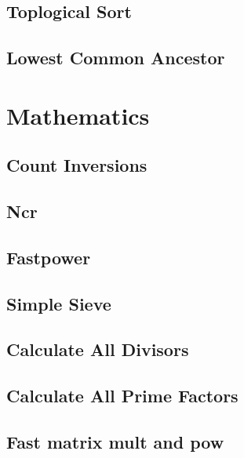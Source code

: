 \subsection{Toplogical Sort}
\raggedbottom
\hrulefill
\subsection{Lowest Common Ancestor}
\raggedbottom
\hrulefill

\section{Mathematics}
\subsection{Count Inversions}
\raggedbottom
\hrulefill
\subsection{Ncr}
\raggedbottom
\hrulefill
\subsection{Fastpower}
\raggedbottom
\hrulefill
\subsection{Simple Sieve}
\raggedbottom
\hrulefill
\subsection{Calculate All Divisors}
\raggedbottom
\hrulefill
\subsection{Calculate All Prime Factors}
\raggedbottom
\hrulefill
\subsection{Fast matrix mult and pow}
\raggedbottom
\hrulefill
